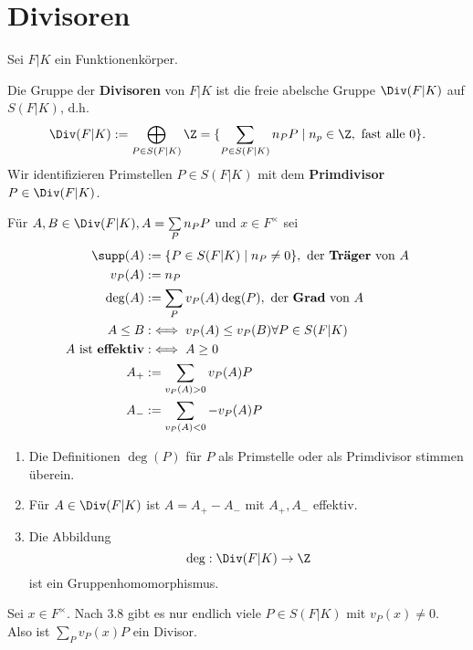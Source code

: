 \section{Divisoren}
Sei $F|K$ ein Funktionenkörper.

\begin{definition}
    Die Gruppe der \textbf{Divisoren} von $F|K$ ist die freie abelsche Gruppe $\Div(F|K)$ auf $S(F|K)$, d.h.
    $$ \Div(F|K) := \bigoplus\limits_{P \in S(F|K)} \Z = \{\sum\limits_{P \in S(F|K)} n_P P \mid n_p \in \Z, \text{ fast alle }0\}.$$
    Wir identifizieren Primstellen $P \in S(F|K)$ mit dem \textbf{Primdivisor} $P \in \Div(F|K)$.

    Für $A,B \in \Div(F|K), A = \sum\limits_P n_P P$ und $x \in F^{\times}$ sei 
    \begin{align*}
        \supp(A) &:= \{P \in S(F|K) \mid n_P \ne 0\}, \text{ der \textbf{Träger} von }A\\
        v_P(A) &:= n_P\\
        \deg(A) &:= \sum\limits_P v_P(A) \deg(P), \text{ der \textbf{Grad} von }A\\
        A \leq B &:\iff v_P(A) \leq v_P(B) \forall P \in S(F|K)\\
        A \text{ ist \textbf{effektiv}} &:\iff A \geq 0\\
        A_+ &:= \sum\limits_{v_P(A) > 0} v_P(A) P\\
        A_- &:= \sum\limits_{v_P(A) < 0} -v_P(A) P
    \end{align*}
\end{definition}

\begin{bemerkungnr}
    \begin{enumerate}
        \item Die Definitionen $\deg(P)$ für $P$ als Primstelle oder als Primdivisor stimmen überein.
        \item Für $A \in \Div(F|K)$ ist $A = A_+ - A_-$ mit $A_+,A_-$ effektiv.
        \item Die Abbildung
        $$ \deg: \Div(F|K) \to \Z$$
        ist ein Gruppenhomomorphismus.
    \end{enumerate}
\end{bemerkungnr}

\begin{beispiel}
    
    Sei $x \in F^{\times}$. Nach 3.8 gibt es nur endlich viele $P \in S(F|K)$ mit $v_P(x) \ne 0$.
    Also ist $\sum\limits_P v_P(x) P$ ein Divisor.
\end{beispiel}

